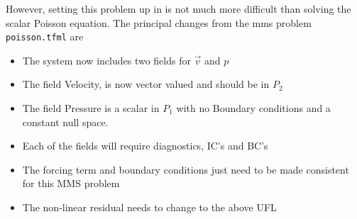 However, setting this problem up in \TF{} is not
much more difficult than solving the scalar Poisson equation.  The
principal changes from the mms problem \texttt{poisson.tfml} are
\begin{itemize}
\setlength{\itemsep}{0em}
\item The system now includes two fields for $\vec{v}$ and $p$
\item The field Velocity, is now vector valued and should be in $P_{2}$
\item The field Pressure is a scalar in $P_{1}$ with no Boundary
  conditions and a constant null space.
\item Each of the fields will require diagnostics, IC's and BC's
\item The forcing term and boundary conditions just need to be made
  consistent for this MMS problem
\item The non-linear residual needs to change to the above UFL
\end{itemize}


